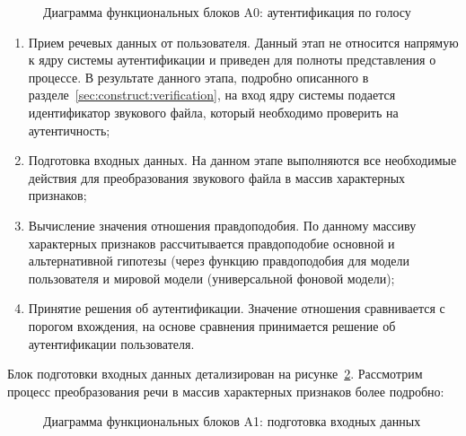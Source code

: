 \begin{figure}
    \caption{Диаграмма функциональных блоков A0: аутентификация по голосу}
    \label{fig:idef0_main}
\end{figure}

\begin{enumerate}
\item Прием речевых данных от пользователя. Данный этап не относится напрямую к ядру системы аутентификации и приведен для полноты представления о процессе. В результате данного этапа, подробно описанного в разделе~\ref{sec:construct:verification}, на вход ядру системы подается идентификатор звукового файла, который необходимо проверить на аутентичность;
\item Подготовка входных данных. На данном этапе выполняются все необходимые действия для преобразования звукового файла в массив характерных признаков;
\item Вычисление значения отношения правдоподобия. По данному массиву характерных признаков рассчитывается правдоподобие основной и альтернативной гипотезы (через функцию правдоподобия для модели пользователя и мировой модели (универсальной фоновой модели);
\item Принятие решения об аутентификации. Значение отношения сравнивается с порогом вхождения, на основе сравнения принимается решение об аутентификации пользователя.
\end{enumerate}

Блок подготовки входных данных детализирован на рисунке~\ref{fig:idef0_pre}. Рассмотрим процесс преобразования речи в массив характерных признаков более подробно:

\begin{figure}
    \caption{Диаграмма функциональных блоков A1: подготовка входных данных}
    \label{fig:idef0_pre}
\end{figure}

